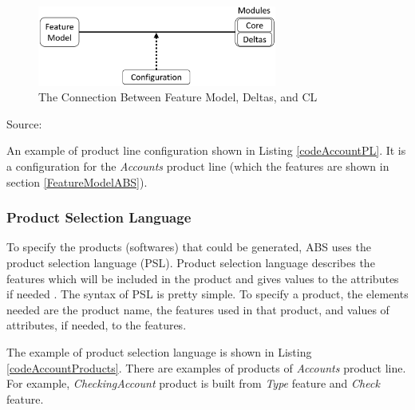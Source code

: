 \begin{figure}
	\centering
	\includegraphics[width=0.7\textwidth]
	{pics/connectionFmodDmodCL2.png}
	\caption{The Connection Between Feature Model, Deltas, and CL}
	\label{fig:connectionFmodDmodCL}
\end{figure}
\vspace{-1cm}
\begin{center}
	{\small Source: \citep{paper.hanle.ABStutorial}}
\end{center}

An example of product line configuration shown in Listing \ref{codeAccountPL}. It is a configuration for the {\it Accounts} product line (which the features are shown in section \ref{FeatureModelABS}).




\subsubsection{Product Selection Language}\label{ProductSelection}
To specify the products (softwares) that could be generated, ABS uses the product selection language (PSL). Product selection language describes the features which will be included in the product and gives values to the attributes if needed \citep{paper.clarke.variability,paper.hanle.ABStutorial,paper.johnsen2014.deploymentVariabilityinDeltaOriented}. The syntax of PSL is pretty simple. To specify a product, the elements needed are the product name, the features used in that product, and values of attributes, if needed, to the features.

The example of product selection language is shown in Listing \ref{codeAccountProducts}. There are examples of products of {\it Accounts} product line. For example, \textit{CheckingAccount} product is built from \textit{Type} feature and \textit{Check} feature.




